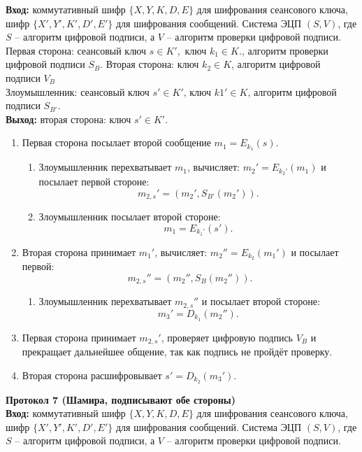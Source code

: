 \hspace*{10mm}\textbf{Вход:} коммутативный шифр $\{X, Y, K, D, E\}$ для шифрования сеансового ключа, шифр $\{X', Y', K', D', E'\}$ для шифрования сообщений. Система ЭЦП $(S,V)$, где $S$ – алгоритм цифровой подписи, а $V$ – алгоритм проверки цифровой подписи.\\
Первая сторона: сеансовый ключ $s\in K',$ ключ $k_{1}\in K.$, алгоритм проверки цифровой подписи $S_{B}$.
Вторая сторона: ключ $k_{2}\in K$, алгоритм цифровой подписи $V_{B}$\\
Злоумышленник: сеансовый ключ $s' \in K'$,  ключ $k1'\in K$, алгоритм цифровой подписи $S_{B'}$.\\
\hspace*{10mm}\textbf{Выход:} вторая сторона: ключ $s'\in K'$.
\begin{enumerate}
\item Первая сторона посылает второй сообщение $m_{1} = E_{k_{1}}(s).$
\begin{enumerate}
	\item Злоумышленник перехватывает $m_{1}$, вычисляет: $m_{2}' = E_{k_{2}'}(m_{1})$ и посылает первой стороне: 
	$$m_{2,s}'= (m_{2}',S_{B'}(m_{2}')).$$
	\item Злоумышленник посылает второй стороне:
	$$m_{1} = E_{k_{1}'}(s').$$
\end{enumerate}
\item Вторая сторона принимает $m_{1}'$, вычисляет: $m_{2}'' = E_{k_{2}}(m_{1}')$ и посылает первой:
	$$m_{2,s}'' = (m_{2}'',S_{B}(m_{2}'')).$$
	\begin{enumerate}
		\item Злоумышленник перехватывает $m_{2,s}''$ и посылает второй стороне:
		$$m_{3}' = D_{k_{1}}(m_{2}'').$$
	\end{enumerate}
\item Первая сторона принимает $m_{2,s}'$, проверяет цифровую подпись $V_{B}$ и прекращает дальнейшее общение, так как подпись не пройдёт проверку.
\item Вторая сторона расшифровывает $s' = D_{k_{2}}(m_{3}').$
\end{enumerate}
\textbf{Протокол 7 (Шамира, подписывают обе стороны)}\\
\hspace*{10mm}\textbf{Вход:} коммутативный шифр $\{X, Y, K, D, E\}$ для шифрования сеансового ключа, шифр $\{X', Y', K', D', E'\}$ для шифрования сообщений. Система ЭЦП $(S,V)$, где $S$ – алгоритм цифровой подписи, а $V$ – алгоритм проверки цифровой подписи.\\
